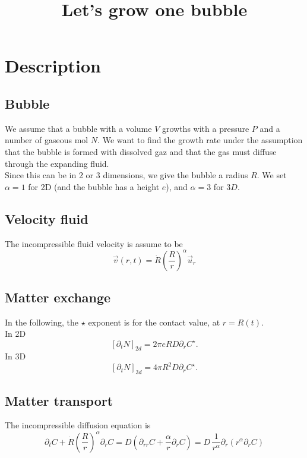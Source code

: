 \documentclass[11pt]{revtex4}
\begin{document}
\title{Let's grow one bubble}

\maketitle

\section{Description}
\subsection{Bubble}
We assume that a bubble with a volume $V$ growths with a pressure $P$ and a number of
gaseous mol $N$.
We want to find the growth rate under the assumption that the bubble is formed with dissolved gaz
and that the gas must diffuse through the expanding fluid.\\
Since this can be in 2 or 3 dimensions, we give the bubble a radius $R$.
We set $\alpha=1$ for 2D (and the bubble has a height $e$), and $\alpha=3$ for $3D$.

\subsection{Velocity fluid}
The incompressible fluid velocity is assume to be
\begin{equation}
	\vec{v}(r,t) = \dot{R} \left(\dfrac{R}{r}\right)^\alpha \vec{u}_r
\end{equation}

\subsection{Matter exchange}
In the following, the $\star$ exponent is for the contact value, at $r=R(t)$.\\
In 2D
\begin{equation}
	\left[\partial_t N\right]_{2d} = 2\pi e R  D \partial_r C^\star.
\end{equation}
In 3D
\begin{equation}
	\left[\partial_t N\right]_{3d} =  4\pi R^2 D \partial_r C^\star.
\end{equation}


\subsection{Matter transport}
The incompressible diffusion equation is
\begin{equation}
	\partial_t C + \dot{R} \left(\dfrac{R}{r}\right)^\alpha  \partial_r C = D \left( \partial_{rr} C + \dfrac{\alpha}{r} \partial_r C \right) = D \, \dfrac{1}{r^\alpha} \partial_r \left(r^\alpha\partial_r C\right)
\end{equation}
\end{document}
